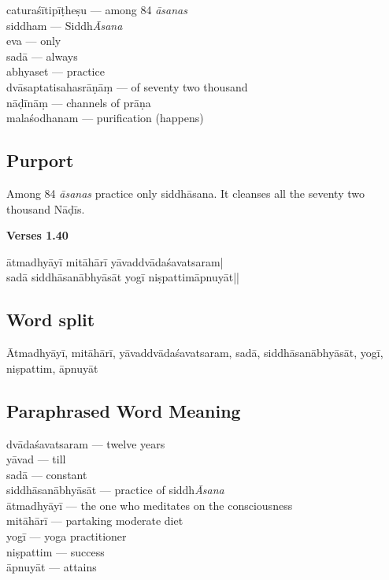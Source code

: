 \begin{multicols}{2}
\itemsep=0pt
caturaśītipīṭheṣu ---  among 84 \textit{āsanas} \\
siddham --- Siddh\textit{Āsana} \\
eva ---  only \\
sadā --- always \\ 		
abhyaset ---  practice	 \\
dvāsaptatisahasrāṇāṃ ---  of seventy two thousand \\
nāḍīnāṃ --- channels of prāṇa \\
malaśodhanam ---  purification (happens)
\end{multicols}

\subsection*{Purport}

Among 84 \textit{āsanas} practice only siddhāsana. It cleanses all the seventy two thousand Nāḍīs. 

\newpage
\noindent \textbf{Verses 1.40}

\begin{shloka}
ātmadhyāyī mitāhārī yāvaddvādaśavatsaram|\\
sadā siddhāsanābhyāsāt yogī niṣpattimāpnuyāt||
\end{shloka}

\subsection*{Word split}

Ātmadhyāyī, mitāhārī, yāvaddvādaśavatsaram, sadā, siddhāsanābhyāsāt, yogī, niṣpattim, āpnuyāt

\subsection*{Paraphrased Word Meaning}

\begin{multicols}{2}
\itemsep=0pt
dvādaśavatsaram --- twelve years \\
yāvad --- till \\
sadā --- constant \\
siddhāsanābhyāsāt --- practice of siddh\textit{Āsana} \\
ātmadhyāyī --- the one who meditates on the consciousness \\
mitāhārī --- partaking moderate diet  \\
yogī --- yoga practitioner \\
niṣpattim ---  success  \\
āpnuyāt --- attains 
\end{multicols}

